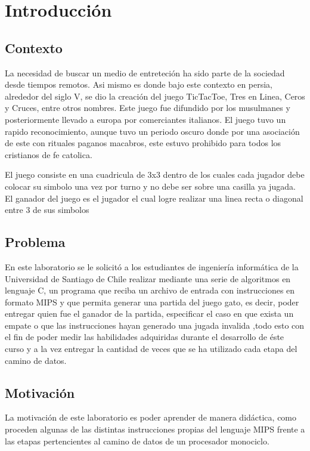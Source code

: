 \section{Introducción}

\subsection{Contexto}
\noindent La necesidad de buscar un medio de entreteción ha sido parte de la sociedad desde tiempos remotos. Asi mismo es donde bajo este contexto en persia, alrededor del siglo V, se dio la creación del juego TicTacToe, Tres en Linea, Ceros y Cruces, entre otros nombres. Este juego fue difundido por los musulmanes y posteriormente llevado a europa por comerciantes italianos. El juego tuvo un rapido reconocimiento, aunque tuvo un periodo oscuro donde por una asociación de este con rituales paganos macabros, este estuvo prohibido para todos los cristianos de fe catolica.

\noindent El juego consiste en una cuadricula de 3x3 dentro de los cuales cada jugador debe colocar su simbolo una vez por turno y no debe ser sobre una casilla ya jugada. El ganador del juego es el jugador el cual logre realizar una linea recta o diagonal entre 3 de sus simbolos

\subsection{Problema}

\noindent En este laboratorio se le solicitó a los estudiantes de ingeniería informática de la Universidad de Santiago de Chile realizar mediante una serie de algoritmos en lenguaje C, un programa que reciba un archivo de entrada con instrucciones en formato MIPS y que permita generar una partida del juego gato, es decir, poder entregar quien fue el ganador de la partida, especificar el caso en que exista un empate o que las instrucciones hayan generado una jugada invalida ,todo esto con el fin de poder medir las habilidades adquiridas durante el desarrollo de éste curso y a la vez entregar la cantidad de veces que se ha utilizado cada etapa del camino de datos.

\subsection{Motivación}

La motivación de este laboratorio es poder aprender de manera didáctica, como proceden algunas de las distintas instrucciones propias del lenguaje MIPS frente a las etapas pertencientes al camino de datos de un procesador monociclo.


